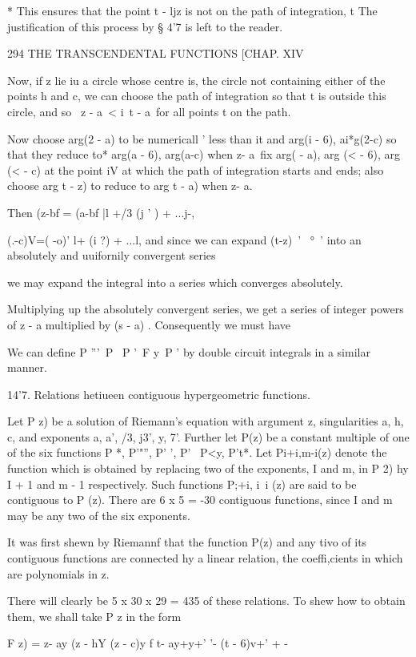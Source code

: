 * This ensures that the point t - ljz is not on the path of
integration, t The justification of this process by § 4'7 is left to
the reader.

294 THE TRANSCENDENTAL FUNCTIONS [CHAP. XIV

Now, if z lie iu a circle whose centre is, the circle not containing
either of the points h and c, we can choose the path of integration so
that t is outside this circle, and so \ z - a\ < i\ t - a\ for all
points t on the path.

Now choose arg(2 - a) to be numericall ' less than it and arg(i - 6),
ai*g(2-c) so that they reduce to* arg(a - 6), arg(a-c) when z- a\ fix
arg( - a), arg (< - 6), arg (< - c) at the point iV at which the path
of integration starts and ends; also choose arg t - z) to reduce to
arg t - a) when z- a.

Then (z-bf = (a-bf |l +/3 (j ' ) + ...j-,

(.-c)V=( -o)' l+ (i ?) + ...l, and since we can expand (t-z)~' ~°~'
into an absolutely and uuifornily convergent series

we may expand the integral into a series which converges absolutely.

Multiplying up the absolutely convergent series, we get a series of
integer powers of z - a multiplied by (s - a) . Consequently we must
have

We can define P '''\ P \ P '\ F y\ P ' by double circuit integrals in
a similar manner.

14'7. Relations hetiueen contiguous hypergeometric functions.

Let P z) be a solution of Riemann's equation with argument z,
singularities a, h, c, and exponents a, a', /3, j3', y, 7'. Further
let P(z) be a constant multiple of one of the six functions P *,
P'"'', P' ', P' \ P<y, P't*. Let Pi+i,m-i(z) denote the function
which is obtained by replacing two of the exponents, I and m, in P 2)
hy I + 1 and m - 1 respectively. Such functions P;+i, i\ i (z) are
said to be contiguous to P (z). There are 6 x 5 = -30 contiguous
functions, since I and m may be any two of the six exponents.

It was first shewn by Riemannf that the function P(z) and any tivo of
its contiguous functions are connected hy a linear relation, the
coeffi,cients in which are polynomials in z.

There will clearly be 5 x 30 x 29 = 435 of these relations. To shew
how to obtain them, we shall take P z in the form

F z) = z- ay (z - hY (z - c)y f t- ay+y+' '- (t - 6)v+' + -

